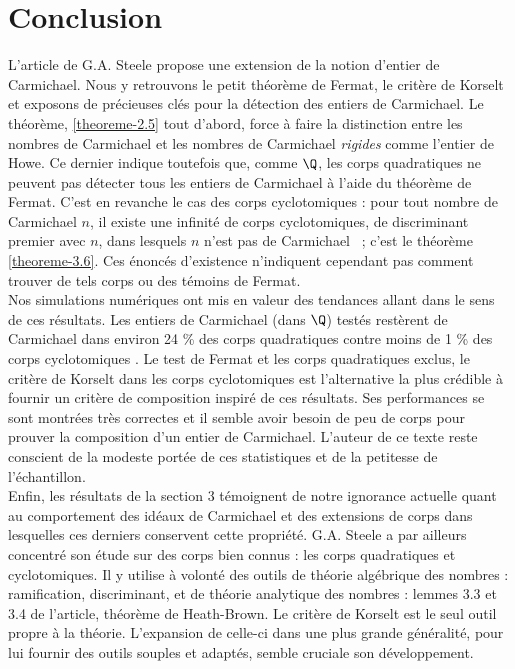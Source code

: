 \section*{Conclusion}

L'article de G.A. Steele propose une extension de la notion d'entier de Carmichael. Nous y retrouvons le petit théorème de Fermat, le critère de Korselt et exposons de précieuses clés pour la détection des entiers de Carmichael. Le théorème, \ref{theoreme-2.5} tout d'abord, force à faire la distinction entre les nombres de Carmichael et les nombres de Carmichael \emph{rigides} comme l'entier de Howe. Ce dernier indique toutefois que, comme $\Q$, les corps quadratiques ne peuvent pas détecter tous les entiers de Carmichael à l'aide du théorème de Fermat. C'est en revanche le cas des corps cyclotomiques : pour tout nombre de Carmichael $n$, il existe une infinité de corps cyclotomiques, de discriminant premier avec $n$, dans lesquels $n$ n'est pas de Carmichael ~; c'est le théorème \ref{theoreme-3.6}. Ces énoncés d'existence n'indiquent cependant pas comment trouver de tels corps ou des témoins de Fermat. \\

Nos simulations numériques ont mis en valeur des tendances allant dans le sens de ces résultats. Les entiers de Carmichael (dans $\Q$) testés restèrent de Carmichael dans environ 24 \% des corps quadratiques  contre moins de 1 \% des corps cyclotomiques . Le test de Fermat et les corps quadratiques exclus, le critère de Korselt dans les corps cyclotomiques  est l'alternative la plus crédible à fournir un critère de composition inspiré de ces résultats. Ses performances se sont montrées très correctes et il semble avoir besoin de peu de corps pour prouver la composition d'un entier de Carmichael. L'auteur de ce texte reste conscient de la modeste portée de ces statistiques et de la petitesse de l'échantillon. \\

Enfin, les résultats de la section 3 témoignent de notre ignorance actuelle quant au comportement des idéaux de Carmichael et des extensions de corps dans lesquelles ces derniers conservent cette propriété. G.A. Steele a par ailleurs concentré son étude sur des corps bien connus : les corps quadratiques et cyclotomiques. Il y utilise à volonté des outils de théorie algébrique des nombres : ramification, discriminant, et de théorie analytique des nombres : lemmes 3.3 et 3.4 de l'article, théorème de Heath-Brown. Le critère de Korselt est le seul outil propre à la théorie. L'expansion de celle-ci dans une plus grande généralité, pour lui fournir des outils souples et adaptés, semble cruciale son développement.
